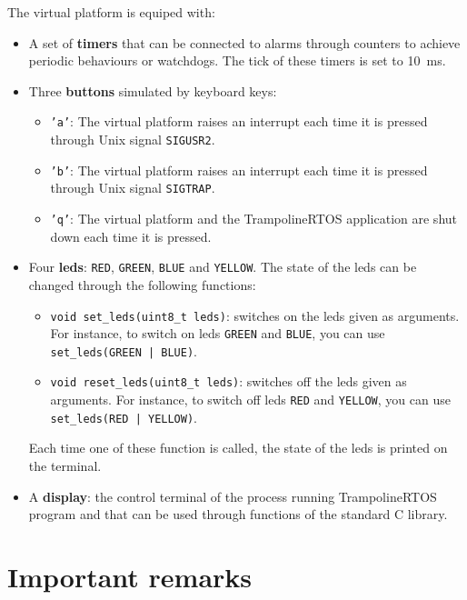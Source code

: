 \documentclass[11pt]{report}
\begin{document}
The virtual platform is equiped with:
\begin{itemize}
  \item
    A set of \textbf{timers} that can be connected to alarms through counters to achieve periodic behaviours or watchdogs.
    The tick of these timers is set to \SI{10}{\milli\second}.
  \item
    Three \textbf{buttons} simulated by keyboard keys:
    \begin{itemize}
      \item
        \texttt{'a'}: The virtual platform raises an interrupt each time it is pressed through Unix signal \verb|SIGUSR2|.

      \item
        \texttt{'b'}: The virtual platform raises an interrupt each time it is pressed through Unix signal \verb|SIGTRAP|.

      \item
        \texttt{'q'}: The virtual platform and the TrampolineRTOS application are shut down each time it is pressed.
    \end{itemize}

  \item
    Four \textbf{leds}: \verb|RED|, \verb|GREEN|, \verb|BLUE| and \verb|YELLOW|.
    The state of the leds can be changed through the following functions:
    \begin{itemize}
      \item
        \verb|void set_leds(uint8_t leds)|: switches on the leds given as arguments.
        For instance, to switch on leds \verb|GREEN| and \verb|BLUE|, you can use \verb-set_leds(GREEN | BLUE)-.
      \item
        \verb|void reset_leds(uint8_t leds)|: switches off the leds given as arguments.
        For instance, to switch off leds \verb|RED| and \verb|YELLOW|, you can use \verb-set_leds(RED | YELLOW)-.
    \end{itemize}
    Each time one of these function is called, the state of the leds is printed on the terminal.
  \item
    A \textbf{display}: the control terminal of the process running TrampolineRTOS program and that can be used through functions of the standard C library.
\end{itemize}

\section{Important remarks}
\end{document}
